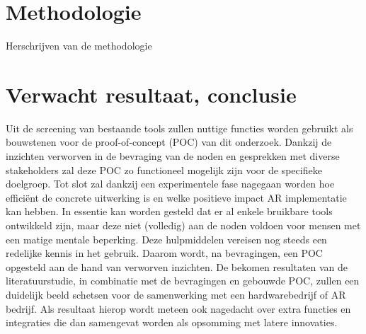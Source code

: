 
\section{Methodologie}%
\label{sec:methodologie}

Herschrijven van de methodologie

\section{Verwacht resultaat, conclusie}%
\label{sec:verwachte_resultaten}

Uit de screening van bestaande tools zullen nuttige functies worden gebruikt als bouwstenen voor de proof-of-concept (POC) van dit onderzoek. 
Dankzij de inzichten verworven in de bevraging van de noden en gesprekken met diverse stakeholders zal deze POC zo functioneel mogelijk zijn voor de specifieke doelgroep. 
Tot slot zal dankzij een experimentele fase nagegaan worden hoe efficiënt de concrete uitwerking is en welke positieve impact AR implementatie kan hebben.
In essentie kan worden gesteld dat er al enkele bruikbare tools ontwikkeld zijn, maar deze niet (volledig) aan de noden voldoen voor mensen met een matige mentale beperking. Deze hulpmiddelen vereisen nog steeds een redelijke kennis in het gebruik. Daarom wordt, na bevragingen, een POC opgesteld aan de hand van verworven inzichten. De bekomen resultaten van de literatuurstudie, in combinatie met de bevragingen en gebouwde POC, zullen een duidelijk beeld schetsen voor de samenwerking met een hardwarebedrijf of AR bedrijf. 
Als resultaat hierop wordt meteen ook nagedacht over extra functies en integraties die dan samengevat worden als opsomming met latere innovaties.

